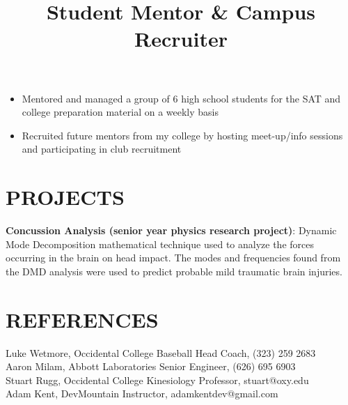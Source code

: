 \documentclass[margin]{res}
\begin{document}
\begin{resume}
\title{\textbf{Student Mentor \& Campus Recruiter}}
\begin{position}
    \begin{itemize}
        \item Mentored and managed a group of 6 high school students for the SAT and college preparation material on a weekly basis
        \item Recruited future mentors from my college by hosting meet-up/info sessions and participating in club recruitment
    \end{itemize}
\end{position}


\section{PROJECTS}
\par
\textbf{Concussion Analysis (senior year physics research project)}: 
Dynamic Mode Decomposition mathematical technique used to analyze the forces occurring in the brain on head impact. The modes and frequencies found from the DMD analysis were used to predict probable mild traumatic brain injuries.

\section{REFERENCES}
Luke Wetmore, Occidental College Baseball Head Coach, (323) 259 2683 \\
Aaron Milam, Abbott Laboratories Senior Engineer, (626) 695 6903 \\
Stuart Rugg, Occidental College Kinesiology Professor, stuart@oxy.edu\\
Adam Kent, DevMountain Instructor, adamkentdev@gmail.com
\end{resume}
\end{document}
